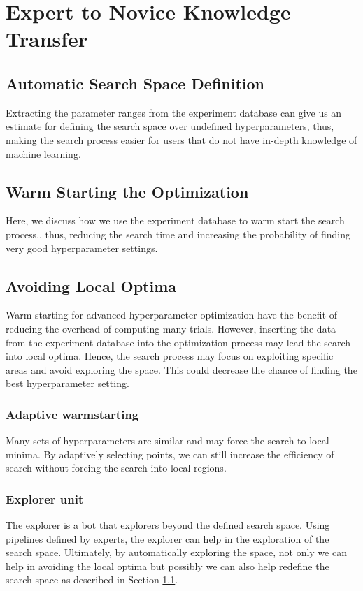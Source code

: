 \section{Expert to Novice Knowledge Transfer} \label{sec-expert-to-novice}
\subsection{Automatic Search Space Definition}\label{sub-section-automatic-search-definition}
Extracting the parameter ranges from the experiment database can give us an estimate for defining the search space over undefined hyperparameters, thus, making the search process easier for users that do not have in-depth knowledge of machine learning.

\subsection{Warm Starting the Optimization}
Here, we discuss how we use the experiment database to warm start the search process., thus, reducing the search time and increasing the probability of finding very good hyperparameter settings.

\subsection{Avoiding Local Optima}
Warm starting for advanced hyperparameter optimization have the benefit of reducing the overhead of computing many trials.
However, inserting the data from the experiment database into the optimization process may lead the search into local optima.
Hence, the search process may focus on exploiting specific areas and avoid exploring the space.
This could decrease the chance of finding the best hyperparameter setting.


\subsubsection{Adaptive warmstarting}
Many sets of hyperparameters are similar and may force the search to local minima.
By adaptively selecting points, we can still increase the efficiency of search without forcing the search into local regions.

\subsubsection{Explorer unit}
The explorer is a bot that explorers beyond the defined search space.
Using pipelines defined by experts, the explorer can help in the exploration of the search space.
Ultimately, by automatically exploring the space, not only we can help in avoiding the local optima but possibly we can also help redefine the search space as described in Section \ref{sub-section-automatic-search-definition}.


